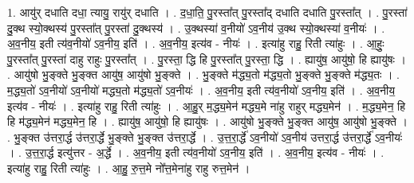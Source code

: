 \documentclass[17pt]{extarticle}
\begin{document}
1. आयु॑र् दधाति दधा॒ त्यायु॒ रायु॑र् दधाति । . द॒धा॒ति॒ पु॒रस्ता᳚त् पु॒रस्ता᳚द् दधाति दधाति पु॒रस्ता᳚त् । . पु॒रस्ता॑ दु॒क्थ स्यो॒क्थस्य॑ पु॒रस्ता᳚त् पु॒रस्ता॑ दु॒क्थस्य॑ । . उ॒क्थस्या॑ व॒नीयो॑ ऽव॒नीय॑ उ॒क्थ स्यो॒क्थस्या॑ व॒नीयः॑ । . अ॒व॒नीय॒ इती त्य॑व॒नीयो॑ ऽव॒नीय॒ इति॑ । . अ॒व॒नीय॒ इत्य॑व - नीयः॑ । . इत्या॑हु राहु॒ रिती त्या॑हुः । . आ॒हुः॒ पु॒रस्ता᳚त् पु॒रस्ता॑ दाहु राहुः पु॒रस्ता᳚त् । . पु॒रस्ता॒ द्धि हि पु॒रस्ता᳚त् पु॒रस्ता॒ द्धि । . ह्यायु॑ष॒ आयु॑षो॒ हि ह्यायु॑षः । . आयु॑षो भु॒ङ्क्ते भु॒ङ्क्त आयु॑ष॒ आयु॑षो भु॒ङ्क्ते । . भु॒ङ्क्ते म॑द्ध्य॒तो म॑द्ध्य॒तो भु॒ङ्क्ते भु॒ङ्क्ते म॑द्ध्य॒तः । . म॒द्ध्य॒तो॑ ऽव॒नीयो॑ ऽव॒नीयो॑ मद्ध्य॒तो म॑द्ध्य॒तो॑ ऽव॒नीयः॑ । . अ॒व॒नीय॒ इती त्य॑व॒नीयो॑ ऽव॒नीय॒ इति॑ । . अ॒व॒नीय॒ इत्य॑व - नीयः॑ । . इत्या॑हु राहु॒ रिती त्या॑हुः । . आ॒हु॒र् म॒द्ध्य॒मेन॑ मद्ध्य॒मे ना॑हु राहुर् मद्ध्य॒मेन॑ । . म॒द्ध्य॒मेन॒ हि हि म॑द्ध्य॒मेन॑ मद्ध्य॒मेन॒ हि । . ह्यायु॑ष॒ आयु॑षो॒ हि ह्यायु॑षः । . आयु॑षो भु॒ङ्क्ते भु॒ङ्क्त आयु॑ष॒ आयु॑षो भु॒ङ्क्ते । . भु॒ङ्क्त उ॑त्तरा॒र्द्ध उ॑त्तरा॒र्द्धे भु॒ङ्क्ते भु॒ङ्क्त उ॑त्तरा॒र्द्धे । . उ॒त्त॒रा॒र्द्धे॑ ऽव॒नीयो॑ ऽव॒नीय॑ उत्तरा॒र्द्ध उ॑त्तरा॒र्द्धे॑ ऽव॒नीयः॑ । . उ॒त्त॒रा॒र्द्ध इत्यु॑त्तर - अ॒र्द्धे । . अ॒व॒नीय॒ इती त्य॑व॒नीयो॑ ऽव॒नीय॒ इति॑ । . अ॒व॒नीय॒ इत्य॑व - नीयः॑ । . इत्या॑हु राहु॒ रिती त्या॑हुः । . आ॒हु॒ रु॒त्त॒मे नो᳚त्त॒मेना॑हु राहु रुत्त॒मेन॑ । \newline
\end{document}
